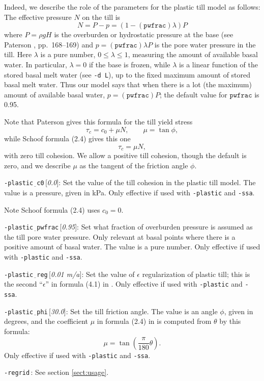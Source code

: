 \documentclass[11pt,final]{amsart}
\newcommand{\eps}{\epsilon}
\newcommand{\rawopt}[1]{\vspace{1mm}\noindent \large\texttt{-#1}\normalsize}
\newcommand{\opt}[1]{\rawopt{#1}\,:\quad}
\newcommand{\optdef}[2]{\rawopt{#1}\,[\textsl{#2}]:\quad}
\newcommand{\und}{$\underline{\,\,\,}$}
\begin{document}
Indeed, we describe the role of the parameters for the plastic till model as follows: The effective pressure $N$ on the till is
	$$N = P - p = (1 - (\mathtt{pwfrac}) \lambda) P$$
where $P = \rho g H$ is the overburden or hydrostatic pressure at the base (see Paterson \cite{Paterson}, pp.~168--169) and $p = (\mathtt{pwfrac}) \lambda P$ is the pore water pressure in the till.  Here $\lambda$ is a pure number, $0\le \lambda \le 1$, measuring the amount of available basal water.  In particular, $\lambda = 0$ if the base is frozen, while $\lambda$ is a linear function of the stored basal melt water (see \verb|-d L|), up to the fixed maximum amount of stored basal melt water.  Thus our model says that when there is a lot (the maximum) amount of available basal water, $p= (\mathtt{pwfrac}) P$; the default value for $\mathtt{pwfrac}$ is 0.95.

Note that Paterson gives this formula for the till yield stress
	$$\tau_c = c_0 + \mu N, \qquad \mu = \tan \phi,$$
while Schoof \cite{SchoofStream} formula (2.4) gives this one
	$$\tau_c = \mu N,$$
with zero till cohesion.  We allow a positive till cohesion, though the default is zero, and we describe $\mu$ as the tangent of the friction angle $\phi$.

\optdef{plastic\und c0}{0.0}  Set the value of the till cohesion in the plastic till model.  The value is a pressure, given in kPa.  Only effective if used with \verb|-plastic| and \verb|-ssa|.

Note Schoof \cite{SchoofStream} formula (2.4) uses $c_0 = 0$.

\optdef{plastic\und pwfrac}{0.95}  Set what fraction of overburden pressure is assumed as the till pore water pressure.  Only relevant at basal points where there is a positive amount of basal water.  The value is a pure number.  Only effective if used with \verb|-plastic| and \verb|-ssa|.

\optdef{plastic\und reg}{0.01 m/a}    Set the value of $\eps$ regularization of plastic till; this is the second ``$\eps$'' in formula (4.1) in \cite{SchoofStream}.  Only effective if used with \verb|-plastic| and \verb|-ssa|.

\optdef{plastic\und phi}{30.0}  Set the till friction angle.  The value is an angle $\phi$, given in degrees, and the coefficient $\mu$ in formula (2.4) in \cite{SchoofStream} is computed from $\theta$ by this formula:
	$$\mu = \tan\left(\frac{\pi}{180} \theta\right).$$
Only effective if used with \verb|-plastic| and \verb|-ssa|.

\opt{regrid}  See section \ref{sect:usage}.
\end{document}
